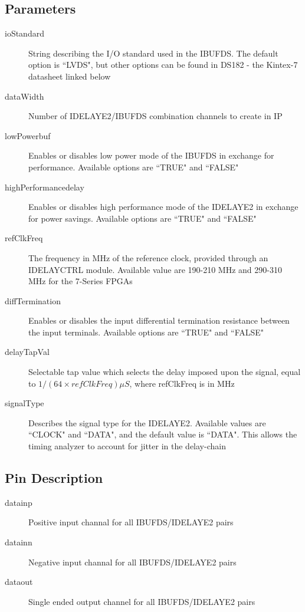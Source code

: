 \documentclass[11pt]{article}
\begin{document}
\subsection{Parameters}
\begin{description}
	\item[ioStandard]String describing the I/O standard used in the IBUFDS. The default option is ``LVDS", but other options can be found
		in DS182 - the Kintex-7 datasheet linked below
	\item[dataWidth]Number of IDELAYE2/IBUFDS combination channels to create in IP
	\item[lowPower\textunderscore buf]Enables or disables low power mode of the IBUFDS in exchange for performance. Available options are ``TRUE" and
		``FALSE"
	\item[highPerformance\textunderscore delay]Enables or disables high performance mode of the IDELAYE2 in exchange for power savings. Available options
		are ``TRUE" and ``FALSE"
	\item[refClkFreq]The frequency in MHz of the reference clock, provided through an IDELAYCTRL module. Available value are 190-210 MHz and 290-310 MHz
		for the 7-Series FPGAs
	\item[diffTermination]Enables or disables the input differential termination resistance between the input terminals. Available options are ``TRUE"
		and ``FALSE"
	\item[delayTapVal]Selectable tap value which selects the delay imposed upon the signal, equal to $1/(64\times refClkFreq)\mu{}S$, where refClkFreq is
		in MHz
	\item[signalType]Describes the signal type for the IDELAYE2. Available values are ``CLOCK" and ``DATA", and the default value is ``DATA". This 
		allows the timing analyzer to account for jitter in the delay-chain
\end{description}
\subsection{Pin Description}
\begin{description}
	\item[data\textunderscore in\textunderscore p]Positive input channal for all IBUFDS/IDELAYE2 pairs
	\item[data\textunderscore in\textunderscore n]Negative input channal for all IBUFDS/IDELAYE2 pairs
	\item[data\textunderscore out]Single ended output channel for all IBUFDS/IDELAYE2 pairs
\end{description}
\end{document}
